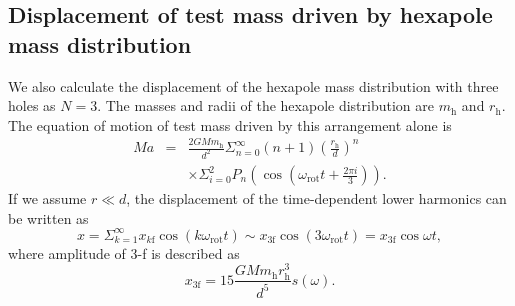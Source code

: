 \documentclass[%
 reprint,
superscriptaddress,
 amsmath,amssymb,
 aps,
]{revtex4-1}
\begin{document}
\subsection{Displacement of test mass driven by hexapole mass distribution} \label{Hexa}
We also calculate the displacement of the hexapole mass distribution with three holes as $N=3$.
The masses and radii of the hexapole distribution are $m_{\mathrm{h}}$ and $r_{\mathrm{h}}$. 
The equation of motion of test mass driven by this arrangement alone is
\begin{eqnarray}
Ma &=& \frac{2GMm_{\mathrm{h}}}{d^2}\Sigma^{\infty}_{n=0}(n+1) \left( \frac{r_{\mathrm{h}}}{d} \right)^n \nonumber \\
&&\times \Sigma^2_{i=0} P_n \left(\cos{\left(\omega_{\mathrm{rot}} t+\frac{2\pi i}{3} \right)} \right).
\end{eqnarray} 
If we assume $r \ll d$, the displacement of the time-dependent lower harmonics can be written as
\begin{equation}
x=\Sigma_{k=1}^{\infty}x_{k\mathrm{f}}\cos(k\omega_{\mathrm{rot}} t)\sim  x_{3\mathrm{f}}\cos(3\omega_{\mathrm{rot}} t)=x_{\mathrm{3f}}\cos{\omega t},
\end{equation}
where amplitude of 3-f is described as
\begin{equation}
 x_{3\mathrm{f}}=15\frac{GMm_{\mathrm{h}}r_{\mathrm{h}}^3}{d^5}s(\omega). \label{3f}
\end{equation}
\end{document}
